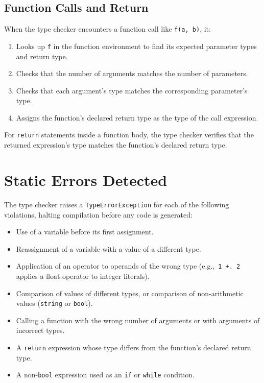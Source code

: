 \documentclass[12pt,a4paper]{report}
\newcommand{\tbool}{\texttt{bool}}
\newcommand{\tstring}{\texttt{string}}
\begin{document}
\subsection{Function Calls and Return}
 
When the type checker encounters a function call like \texttt{f(a, b)}, it:
\begin{enumerate}
  \item Looks up \texttt{f} in the function environment to find its expected
        parameter types and return type.
  \item Checks that the number of arguments matches the number of parameters.
  \item Checks that each argument's type matches the corresponding
        parameter's type.
  \item Assigns the function's declared return type as the type of the
        call expression.
\end{enumerate}
 
For \texttt{return} statements inside a function body, the type checker
verifies that the returned expression's type matches the function's declared
return type.
 
\section{Static Errors Detected}
 
The type checker raises a \texttt{TypeErrorException} for each of the
following violations, halting compilation before any code is generated:
 
\begin{itemize}
  \item Use of a variable before its first assignment.
  \item Reassignment of a variable with a value of a different type.
  \item Application of an operator to operands of the wrong type
        (e.g.,\ \texttt{1 +. 2} applies a float operator to integer literals).
  \item Comparison of values of different types, or comparison of
        non-arithmetic values (\tstring{} or \tbool).
  \item Calling a function with the wrong number of arguments or with
        arguments of incorrect types.
  \item A \texttt{return} expression whose type differs from the function's
        declared return type.
  \item A non-\tbool{} expression used as an \texttt{if} or \texttt{while}
        condition.
\end{itemize}
\end{document}
